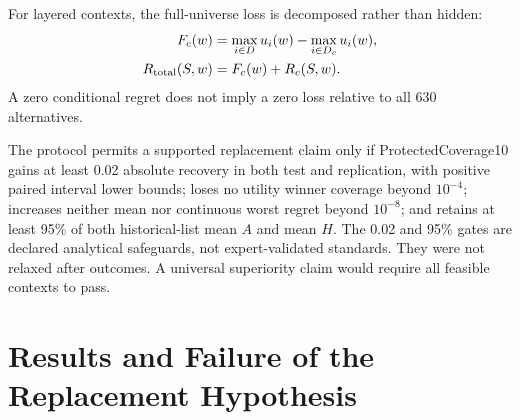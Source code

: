 \documentclass{llncs}
\begin{document}
For layered contexts, the full-universe loss is decomposed rather than hidden:
\begin{align}
 F_c(w)&=\max_{i\in D}u_i(w)-\max_{i\in D_c}u_i(w),\\
 R_{\rm total}(S,w)&=F_c(w)+R_c(S,w).
\end{align}
A zero conditional regret does not imply a zero loss relative to all 630 alternatives.

The protocol permits a supported replacement claim only if ProtectedCoverage10 gains at least 0.02 absolute recovery in both test and replication, with positive paired interval lower bounds; loses no utility winner coverage beyond $10^{-4}$; increases neither mean nor continuous worst regret beyond $10^{-8}$; and retains at least 95\% of both historical-list mean $A$ and mean $H$. The 0.02 and 95\% gates are declared analytical safeguards, not expert-validated standards. They were not relaxed after outcomes. A universal superiority claim would require all feasible contexts to pass.

\section{Results and Failure of the Replacement Hypothesis}
\end{document}
